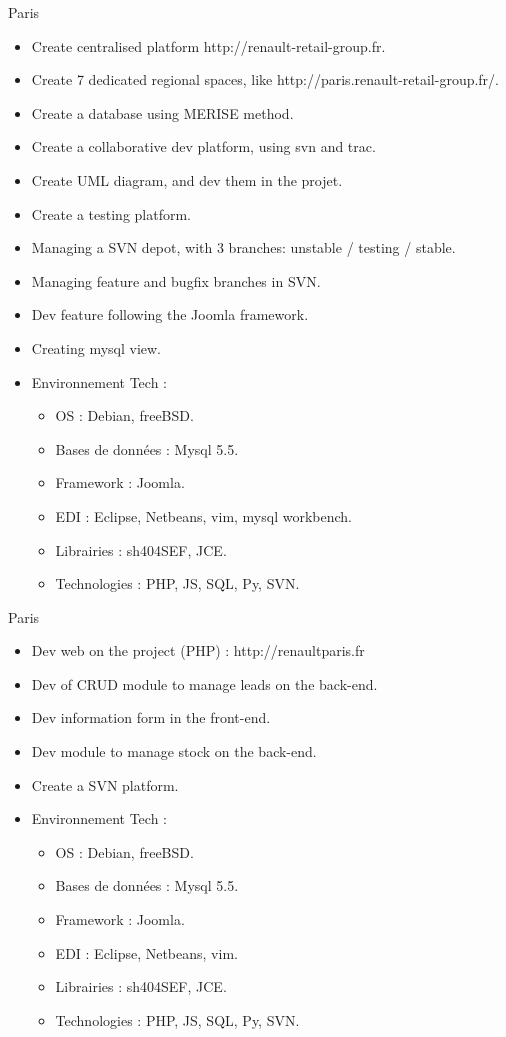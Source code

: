 \documentclass[10pt,a4paper,sans]{moderncv}
\begin{document}
{Paris}{
  \begin{itemize}%
    \item Create centralised platform http://renault-retail-group.fr.
    \item Create 7 dedicated regional spaces, like http://paris.renault-retail-group.fr/.
    \item Create a database using MERISE method.
    \item Create a collaborative dev platform, using svn and trac.
    \item Create UML diagram, and dev them in the projet.
    \item Create a testing platform.
    \item Managing a SVN depot, with 3 branches: unstable / testing / stable.
    \item Managing feature and bugfix branches in SVN.
    \item Dev feature following the Joomla framework.
    \item Creating mysql view.
    \item Environnement Tech :
      \begin{itemize}%
        \item OS : Debian, freeBSD.
        \item Bases de données : Mysql 5.5.
        \item Framework : Joomla.
        \item EDI : Eclipse, Netbeans, vim, mysql workbench.
        \item Librairies : sh404SEF, JCE.
        \item Technologies : PHP, JS, SQL, Py, SVN.
      \end{itemize}
  \end{itemize}}

{Paris}{
  \begin{itemize}%
    \item Dev web on the project (PHP) : http://renaultparis.fr
    \item Dev of CRUD module to manage leads on the back-end.
    \item Dev information form in the front-end.
    \item Dev module to manage stock on the back-end.
    \item Create a SVN platform.
    \item Environnement Tech :
      \begin{itemize}%
        \item OS : Debian, freeBSD.
        \item Bases de données : Mysql 5.5.
        \item Framework : Joomla.
        \item EDI : Eclipse, Netbeans, vim.
        \item Librairies : sh404SEF, JCE.
        \item Technologies : PHP, JS, SQL, Py, SVN.
      \end{itemize}
  \end{itemize}}
\end{document}
